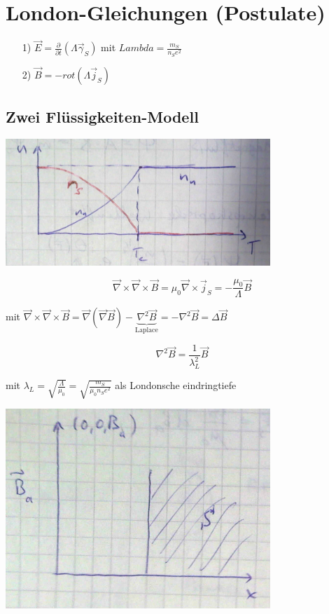\section{London-Gleichungen (Postulate)}

\begin{enumerate}
\item[1)] \(\vec E = \frac{\partial}{\partial t}(\Lambda \vec \gamma_S)\) mit \(Lambda = \frac{m_S}{n_Se^2}\)
\item[2)] \(\vec B = -rot(\Lambda \vec j_S)\)
\end{enumerate}

\subsection{Zwei Flüssigkeiten-Modell}

\includegraphics[width=0.75\textwidth]{kap13_06.png}


\[\vec \nabla\times\vec\nabla\times \vec B = \mu_0\vec\nabla\times\vec j_S = -\frac{\mu_0}{\Lambda}\vec B\]

mit \( \vec \nabla\times\vec\nabla\times \vec B = \vec\nabla(\vec \nabla\vec B)-\underbrace{\nabla^2\vec B}_{\text{Laplace}} = -\nabla^2\vec B = \Delta \vec B \)

\[\nabla^2\vec B = \frac{1}{\lambda^2_L}\vec B\]

mit \(\lambda_L = \sqrt{\frac{\Lambda}{\mu_0}} = \sqrt{\frac{m_S}{\mu_0 n_S e^2}}\) als Londonsche eindringtiefe


\includegraphics[width=0.75\textwidth]{kap13_07.png}


